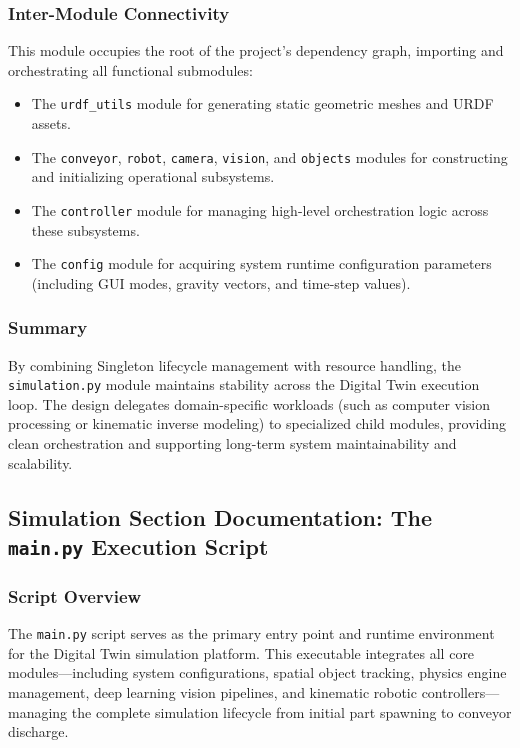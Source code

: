 \documentclass{article}
\begin{document}
\subsubsection{Inter-Module Connectivity}
This module occupies the root of the project's dependency graph, importing and orchestrating all functional submodules:

\begin{itemize}
	\item The \texttt{urdf\_utils} module for generating static geometric meshes and URDF assets.
	\item The \texttt{conveyor}, \texttt{robot}, \texttt{camera}, \texttt{vision}, and \texttt{objects} modules for constructing and initializing operational subsystems.
	\item The \texttt{controller} module for managing high-level orchestration logic across these subsystems.
	\item The \texttt{config} module for acquiring system runtime configuration parameters (including GUI modes, gravity vectors, and time-step values).
\end{itemize}

\subsubsection{Summary}
By combining Singleton lifecycle management with resource handling, the \texttt{simulation.py} module maintains stability across the Digital Twin execution loop. The design delegates domain-specific workloads (such as computer vision processing or kinematic inverse modeling) to specialized child modules, providing clean orchestration and supporting long-term system maintainability and scalability.

\subsection{Simulation Section Documentation: The \texttt{main.py} Execution Script}

\subsubsection{Script Overview}
The \texttt{main.py} script serves as the primary entry point and runtime environment for the Digital Twin simulation platform. This executable integrates all core modules—including system configurations, spatial object tracking, physics engine management, deep learning vision pipelines, and kinematic robotic controllers—managing the complete simulation lifecycle from initial part spawning to conveyor discharge.
\end{document}
